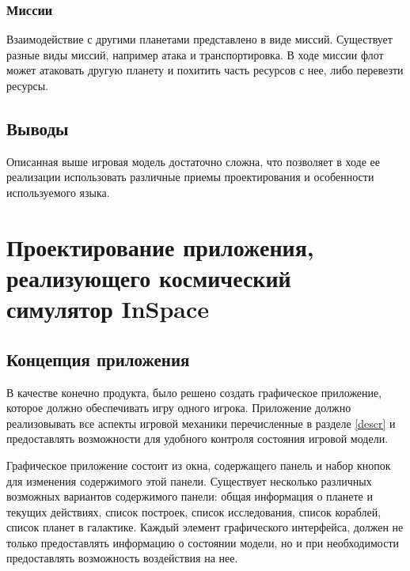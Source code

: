 \subsubsection{Миссии}
Взаимодействие с другими планетами представлено в виде миссий. Существует разные виды миссий, например атака и транспортировка. В ходе миссии флот может атаковать другую планету и похитить часть ресурсов с нее, либо перевезти ресурсы.


\subsection{Выводы}
Описанная выше игровая модель достаточно сложна, что позволяет в ходе ее реализации использовать различные приемы проектирования и особенности используемого языка.  


\section{Проектирование приложения, реализующего космический симулятор InSpace}

\subsection{Концепция приложения} 

В качестве конечно продукта, было решено создать графическое приложение, которое должно обеспечивать игру одного игрока. Приложение должно реализовывать все аспекты игровой механики перечисленные в разделе \ref{descr} и предоставлять возможности для удобного контроля состояния игровой модели. 

Графическое приложение состоит из окна, содержащего панель и набор кнопок для изменения содержимого этой панели. Существует несколько различных возможных вариантов содержимого панели: общая информация о планете и текущих действиях, список построек, список исследования, список кораблей, список планет в галактике. Каждый элемент графического интерфейса, должен не только предоставлять информацию о состоянии модели, но и при необходимости предоставлять возможность воздействия на нее.

